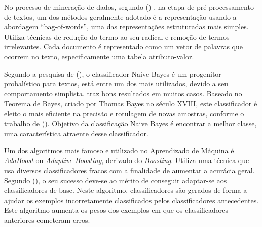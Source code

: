 

No processo de mineração de dados, segundo 
 (\citeyear{matsubara2003pretext}) , na 
etapa de pré-processamento de textos, um dos métodos geralmente adotado é a 
representação usando a abordagem ``bag-of-words'', uma das 
representações estruturadas mais simples. Utiliza técnicas de redução do 
termo ao seu radical e remoção de termos irrelevantes. Cada documento é 
representado como um vetor de palavras que ocorrem no texto, 
especificamente uma tabela atributo-valor. 

Segundo a pesquisa de  
(\citeyear{de2017mineraccao}), o classificador Naive Bayes é um 
progenitor probalístico para textos, está entre um dos mais utilizados, devido 
a seu comportamento simplista, traz bons resultados em muitos casos. Baseado no 
Teorema de Bayes, criado por Thomas Bayes no século XVIII, este classificador é 
eleito o mais eficiente na precisão e rotulagem de novas amostras, conforme o 
trabalho de  
(\citeyear{chakrabarti2002mining}). Objetivo da classificação Naive Bayes é 
encontrar a melhor classe, uma característica atraente desse classificador.

Um dos algoritmos mais famoso e utilizado no Aprendizado de Máquina é 
\textit{AdaBoost} ou \textit{Adaptive Boosting}, derivado do \textit{Boosting}. 
Utiliza uma técnica que usa diversos classificadores fracos com a finalidade de 
aumentar a acurácia geral. Segundo  
(\citeyear{dos2015detecccao}), o seu sucesso deve-se ao mérito 
de conseguir adaptar-se aos classificadores de base. Neste algoritmo, 
classificadores são gerados de forma a ajudar os exemplos incorretamente 
classificados pelos classificadores antecedentes. Este algoritmo aumenta os 
pesos dos exemplos em que os classificadores anteriores cometeram erros.